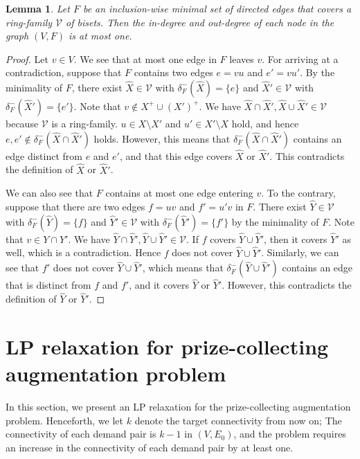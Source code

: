 \documentclass[11pt]{article}
\newtheorem{lemma}{Lemma}
\newcommand{\Vfam}{\mathcal{V}}
\begin{document}
\begin{lemma}\label{lem.ring-cover}
 Let $F$ be an inclusion-wise minimal set of directed edges 
 that covers a ring-family $\Vfam$ of bisets.
 Then the in-degree and out-degree of each node in the graph $(V,F)$ 
 is at most one.
\end{lemma}
\begin{proof}
 Let $v \in V$.
 We see that at most one edge in $F$ leaves $v$.
 For arriving at a contradiction, suppose that
 $F$ contains two edges $e=vu$ and $e'=vu'$.
 By the minimality of $F$,
 there exist $\hat{X} \in \Vfam$  
 with $\delta^-_{F}(\hat{X})=\{e\}$ and 
 $\hat{X}' \in \Vfam$  
 with $\delta^-_{F}(\hat{X}')=\{e'\}$.
 Note that $v \not\in X^+ \cup (X')^+$.
 We have $\hat{X}\cap \hat{X}', \hat{X}\cup \hat{X}'\in \Vfam$
 because $\Vfam$ is a ring-family.
 $u \in X\setminus X'$ and $u' \in X' \setminus X$ hold,
 and hence $e,e' \not\in \delta_{F}^-(\hat{X}\cap\hat{X}')$ holds.
 However, this means that $\delta_{F}^-(\hat{X}\cap\hat{X}')$ contains
 an edge distinct from $e$ and $e'$,
 and that this edge covers $\hat{X}$ or $\hat{X}'$.
 This contradicts the definition of $\hat{X}$ or $\hat{X}'$.

 We can also see that
 $F$ contains at most one edge entering $v$.
 To the contrary, suppose that
 there are two edges $f=uv$ and $f'=u'v$ in $F$.
 There exist $\hat{Y} \in \Vfam$  
 with $\delta^-_{F}(\hat{Y})=\{f\}$ and 
 $\hat{Y}' \in \Vfam$  
 with $\delta^-_{F}(\hat{Y}')=\{f'\}$ by the minimality of
 $F$.
 Note that $v \in Y \cap Y'$.
 We have $\hat{Y}\cap \hat{Y}', \hat{Y}\cup \hat{Y}'\in \Vfam$.
 If $f$ covers $\hat{Y}\cup \hat{Y}'$,
 then it covers $\hat{Y}'$ as well, which is a contradiction.
 Hence $f$ does not cover $\hat{Y}\cup \hat{Y}'$.
 Similarly, we can see that $f'$ does not cover $\hat{Y}\cup
 \hat{Y}'$, which means that $\delta^-_{F}(\hat{Y}\cup \hat{Y}')$ contains
 an edge that is distinct from $f$ and $f'$, and it
  covers $\hat{Y}$ or $\hat{Y}'$.
 However, this contradicts the definition of $\hat{Y}$ or $\hat{Y}'$.
\end{proof}


\section{LP relaxation for prize-collecting augmentation problem}
\label{sec.LP}

In this section, we present an LP relaxation for the prize-collecting
augmentation problem. 
Henceforth, we let $k$ denote the target connectivity from now on; 
The connectivity of each demand pair is $k-1$ in $(V,E_0)$,
and the problem
requires an increase in the connectivity of each demand pair by at least one.
\end{document}
